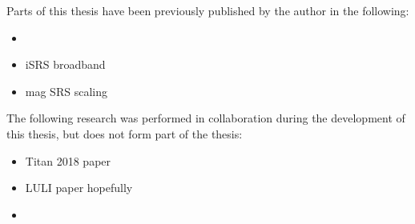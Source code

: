 
\begin{thesisdeclaration}


\noindent Parts of this thesis have been previously published by the author in the following:
\begin{singlespacing}
\begin{itemize}
    \item {}
    \item iSRS broadband
    \item mag SRS scaling
\end{itemize}{}
\end{singlespacing}

\noindent The following research was performed in collaboration during the development of this thesis, but does not form part of the thesis:
\begin{singlespacing}
\begin{itemize}
    \item Titan 2018 paper
    \item LULI paper hopefully
    \item {}

\end{itemize}
\end{singlespacing}
\end{thesisdeclaration}
